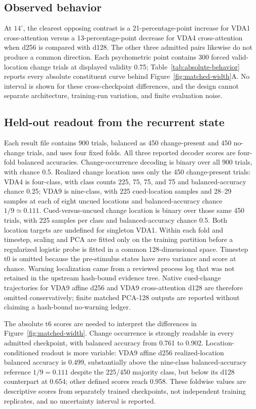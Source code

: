 \documentclass[11pt,a4paper]{article}
\begin{document}
\subsection{Observed behavior}
At $14^\circ$, the clearest opposing contrast is a 21-percentage-point increase for VDA1 cross-attention versus a 13-percentage-point decrease for VDA4 cross-attention when d256 is compared with d128. The other three admitted pairs likewise do not produce a common direction. Each psychometric point contains 300 forced valid-location change trials at displayed validity 0.75; Table~\ref{tab:absolute-behavior} reports every absolute constituent curve behind Figure~\ref{fig:matched-width}A. No interval is shown for these cross-checkpoint differences, and the design cannot separate architecture, training-run variation, and finite evaluation noise.

\subsection{Held-out readout from the recurrent state}
Each result file contains 900 trials, balanced as 450 change-present and 450 no-change trials, and uses four fixed folds. All three reported decoder scores are four-fold balanced accuracies. Change-occurrence decoding is binary over all 900 trials, with chance 0.5. Realized change location uses only the 450 change-present trials: VDA4 is four-class, with class counts 225, 75, 75, and 75 and balanced-accuracy chance 0.25; VDA9 is nine-class, with 225 cued-location samples and 28--29 samples at each of eight uncued locations and balanced-accuracy chance $1/9\simeq0.111$. Cued-versus-uncued change location is binary over those same 450 trials, with 225 samples per class and balanced-accuracy chance 0.5. Both location targets are undefined for singleton VDA1. Within each fold and timestep, scaling and PCA are fitted only on the training partition before a regularized logistic probe is fitted in a common 128-dimensional space. Timestep t0 is omitted because the pre-stimulus states have zero variance and score at chance. Warning localization came from a reviewed process log that was not retained in the upstream hash-bound evidence tree. Native cued-change trajectories for VDA9 affine d256 and VDA9 cross-attention d128 are therefore omitted conservatively; finite matched PCA-128 outputs are reported without claiming a hash-bound no-warning ledger.

The absolute t6 scores are needed to interpret the differences in Figure~\ref{fig:matched-width}. Change occurrence is strongly readable in every admitted checkpoint, with balanced accuracy from 0.761 to 0.902. Location-conditioned readout is more variable: VDA9 affine d256 realized-location balanced accuracy is 0.499, substantially above the nine-class balanced-accuracy reference $1/9=0.111$ despite the 225/450 majority class, but below its d128 counterpart at 0.654; other defined scores reach 0.958. These foldwise values are descriptive scores from separately trained checkpoints, not independent training replicates, and no uncertainty interval is reported.
\end{document}
